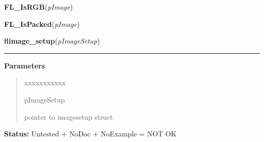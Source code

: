     \label{xformslib:library:FL_IsRGB}

    \vspace{0.5ex}

\hspace{.8\funcindent}\begin{boxedminipage}{\funcwidth}

    \raggedright \textbf{FL\_IsRGB}(\textit{pImage})

\setlength{\parskip}{2ex}
\setlength{\parskip}{1ex}
    \end{boxedminipage}

    \label{xformslib:library:FL_IsPacked}

    \vspace{0.5ex}

\hspace{.8\funcindent}\begin{boxedminipage}{\funcwidth}

    \raggedright \textbf{FL\_IsPacked}(\textit{pImage})

\setlength{\parskip}{2ex}
\setlength{\parskip}{1ex}
    \end{boxedminipage}

    \label{xformslib:library:flimage_setup}

    \vspace{0.5ex}

\hspace{.8\funcindent}\begin{boxedminipage}{\funcwidth}

    \raggedright \textbf{flimage\_setup}(\textit{pImageSetup})

    \vspace{-1.5ex}

    \rule{\textwidth}{0.5\fboxrule}
\setlength{\parskip}{2ex}
\setlength{\parskip}{1ex}
      \textbf{Parameters}
      \vspace{-1ex}

      \begin{quote}
        \begin{Ventry}{xxxxxxxxxxx}

          \item[pImageSetup]

          pointer to imagesetup struct

        \end{Ventry}

      \end{quote}

\textbf{Status:} Untested + NoDoc + NoExample = NOT OK



    \end{boxedminipage}

